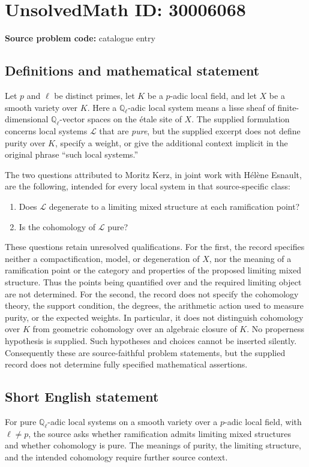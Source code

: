 \documentclass[11pt]{article}
\begin{document}
\section*{UnsolvedMath ID: 30006068}
\textbf{Source problem code:} catalogue entry
\subsection{Definitions and mathematical statement}
Let \(p\) and \(\ell\) be distinct primes, let \(K\) be a \(p\)-adic local field, and let \(X\) be a smooth variety over \(K\). Here a \(\mathbb Q_\ell\)-adic local system means a lisse sheaf of finite-dimensional \(\mathbb Q_\ell\)-vector spaces on the étale site of \(X\). The supplied formulation concerns local systems \(\mathcal L\) that are \emph{pure}, but the supplied excerpt does not define purity over \(K\), specify a weight, or give the additional context implicit in the original phrase ``such local systems.''

The two questions attributed to Moritz Kerz, in joint work with Hélène Esnault, are the following, intended for every local system in that source-specific class:
\begin{enumerate}
\item Does \(\mathcal L\) degenerate to a limiting mixed structure at each ramification point?
\item Is the cohomology of \(\mathcal L\) pure?
\end{enumerate}

These questions retain unresolved qualifications. For the first, the record specifies neither a compactification, model, or degeneration of \(X\), nor the meaning of a ramification point or the category and properties of the proposed limiting mixed structure. Thus the points being quantified over and the required limiting object are not determined. For the second, the record does not specify the cohomology theory, the support condition, the degrees, the arithmetic action used to measure purity, or the expected weights. In particular, it does not distinguish cohomology over \(K\) from geometric cohomology over an algebraic closure of \(K\). No properness hypothesis is supplied. Such hypotheses and choices cannot be inserted silently. Consequently these are source-faithful problem statements, but the supplied record does not determine fully specified mathematical assertions.
\subsection{Short English statement}
For pure \(\mathbb Q_\ell\)-adic local systems on a smooth variety over a \(p\)-adic local field, with \(\ell\ne p\), the source asks whether ramification admits limiting mixed structures and whether cohomology is pure. The meanings of purity, the limiting structure, and the intended cohomology require further source context.
\end{document}

